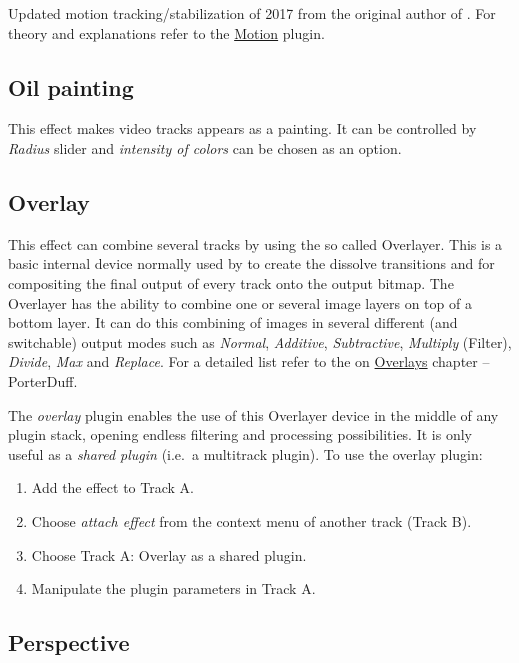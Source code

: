 Updated motion tracking/stabilization of 2017 from the original author of \CGG{}. For theory and explanations refer to the \hyperref[sub:motion]{Motion} plugin.

\subsection{Oil painting}%
\label{sub:oil_painting}

This effect makes video tracks appears as a painting. It can be controlled by \textit{Radius} slider and \textit{intensity of colors} can be chosen as an option.

\subsection{Overlay}%
\label{sub:overlay}

This effect can combine several tracks by using the so called Overlayer. This is a basic internal device normally used by \CGGI{} to create the dissolve transitions and for compositing the final output of every track onto the output bitmap. The Overlayer has the ability to combine one or several image layers on top of a bottom layer. It can do this combining of images in several different (and switchable) output modes such as \textit{Normal}, \textit{Additive}, \textit{Subtractive}, \textit{Multiply} (Filter), \textit{Divide}, \textit{Max} and \textit{Replace}. For a detailed list refer to the on \hyperref[cha:overlays]{Overlays} chapter  -- PorterDuff.

The \textit{overlay} plugin enables the use of this Overlayer device in the middle of any plugin stack, opening endless filtering and processing possibilities. It is only useful as a \textit{shared plugin} (i.e.\ a multitrack plugin). To use the overlay plugin:

\begin{enumerate}
    \item Add the effect to Track A.
    \item Choose \textit{attach effect} from the context menu of another track (Track B).
    \item Choose Track A: Overlay as a shared plugin.
    \item Manipulate the plugin parameters in Track A.
\end{enumerate}

\subsection{Perspective}%
\label{sub:perspective}

